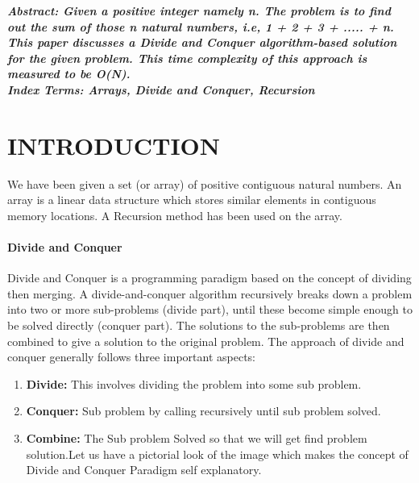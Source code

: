 \documentclass[10pt]{article}
\begin{document}
\begin{multicols*}{2}

    \textbf{\emph{{Abstract}: Given a positive integer namely n. The problem is to find out the sum of those n natural numbers, i.e, 1 + 2 + 3 + ..... + n. This paper discusses a Divide and Conquer algorithm-based solution for the given problem. This time complexity of this approach is measured to be O(N).}}\\
	
	\textbf{\emph{{Index Terms}: Arrays, Divide and Conquer, Recursion\\}}


\section*{INTRODUCTION}
 
We have been given a set (or array) of positive contiguous natural numbers. An array is a linear data structure which stores similar elements in contiguous memory locations. A Recursion method has been used on the array.

\paragraph{Divide and Conquer}
Divide and Conquer is a programming paradigm based on the concept of dividing then merging. A divide-and-conquer algorithm recursively breaks down a problem into two or more sub-problems (divide part), until these become simple enough to be solved directly (conquer part). The solutions to the sub-problems are then combined to give a solution to the original problem. The approach of divide and conquer generally follows three important aspects:
\begin{enumerate}
    \item\textbf{Divide:} This involves dividing the problem into some sub problem.
    \item\textbf{Conquer:} Sub problem by calling recursively until sub problem solved.
    \item\textbf{Combine:} The Sub problem Solved so that we will get find problem solution.Let us have a pictorial look of the image which makes the concept of Divide and Conquer Paradigm self explanatory.\\\\
\end{enumerate}


\end{multicols*}
\end{document}
